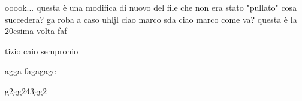 \usepackage{pdfcomment}


    ooook... questa è una modifica di nuovo del file che non era stato "pullato" cosa succedera?
ga    roba a caso 
uhljl
ciao marco sda
ciao marco come va? questa è la 20esima volta 
    faf
    

    tizio caio
    sempronio

    agga
    fagagage


    g2gg243gg2
